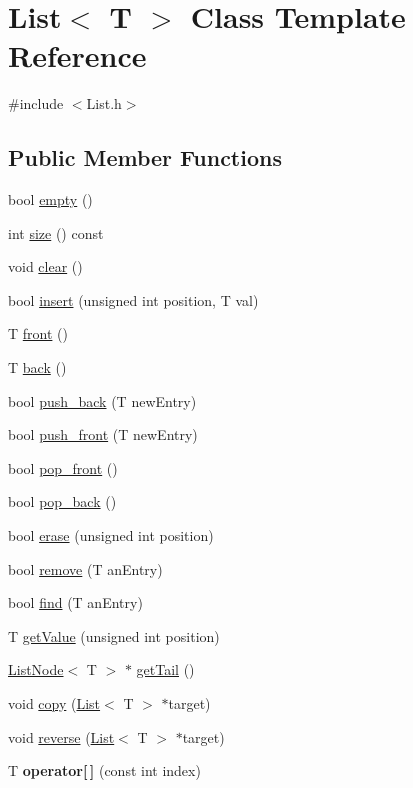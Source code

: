 \hypertarget{class_list}{}\section{List$<$ T $>$ Class Template Reference}
\label{class_list}


{\ttfamily \#include $<$List.\+h$>$}

\subsection*{Public Member Functions}
\begin{DoxyCompactItemize}
\item 
bool \hyperlink{class_list_a3737ca60365287ce663393d8c07d1a41}{empty} ()
\item 
int \hyperlink{class_list_aec8852ab225094e14ad424e8d71a4dac}{size} () const
\item 
void \hyperlink{class_list_ae296516a252e11963dbf963727ce429a}{clear} ()
\item 
bool \hyperlink{class_list_a9c20ddd34151f1fdf67549f3c94364da}{insert} (unsigned int position, T val)
\item 
T \hyperlink{class_list_a2606aeb0b00885fd7b3037a29ae28c8b}{front} ()
\item 
T \hyperlink{class_list_adcdd54cf42f6a98990618901e1fafa59}{back} ()
\item 
bool \hyperlink{class_list_adef1cfd54ad3f25eb27acde794e7f279}{push\+\_\+back} (T new\+Entry)
\item 
bool \hyperlink{class_list_a7ad16a889175f6bbb32aeb295c8f30c3}{push\+\_\+front} (T new\+Entry)
\item 
bool \hyperlink{class_list_a60579fbdaaceccb61aa5d8e33224e045}{pop\+\_\+front} ()
\item 
bool \hyperlink{class_list_aa6ff98e23b4ceea509e3a29fa5ceecd7}{pop\+\_\+back} ()
\item 
bool \hyperlink{class_list_a0af93f391664cbd3476b1a0fe0d3619e}{erase} (unsigned int position)
\item 
bool \hyperlink{class_list_a91f71c17d25baa99323e99297695492f}{remove} (T an\+Entry)
\item 
bool \hyperlink{class_list_a2be90274aca8ed14ede6d6892b4e82f1}{find} (T an\+Entry)
\item 
T \hyperlink{class_list_a54d9d5eb688177d16ae8f33a317282a5}{get\+Value} (unsigned int position)
\item 
\hyperlink{class_list_node}{List\+Node}$<$ T $>$ $\ast$ \hyperlink{class_list_a9d222b730d906bcf6fb0834c9c729788}{get\+Tail} ()
\item 
void \hyperlink{class_list_ac6c3b0e253ce3c9b90053b95769f12a9}{copy} (\hyperlink{class_list}{List}$<$ T $>$ $\ast$target)
\item 
void \hyperlink{class_list_ac17012219fedb7d746f5c13501af164e}{reverse} (\hyperlink{class_list}{List}$<$ T $>$ $\ast$target)
\item 
\mbox{\label{class_list_a8133b9df5dcb7941610a4949be986660}} 
T {\bfseries operator\mbox{[}$\,$\mbox{]}} (const int index)
\end{DoxyCompactItemize}
